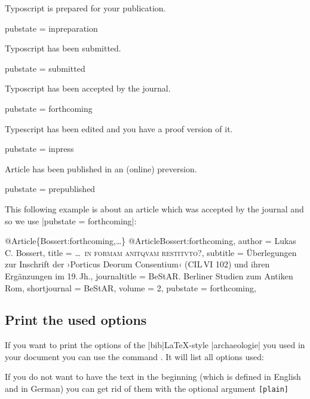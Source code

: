 \documentclass[a4paper,
10pt,
greek,
french,
spanish,
italian,
ngerman,
english
]{ltxdoc}
\begin{document}
Typoscript is prepared for your publication. 
\begin{code}
pubstate = {inpreparation}
\end{code}

Typoscript has been submitted.
\begin{code}
pubstate = {submitted}
\end{code}

Typoscript has been accepted by the journal.
\begin{code}
pubstate = {forthcoming}
\end{code}

Typescript has been edited and you have a proof version of it.
\begin{code}
pubstate = {inpress}
\end{code}

Article has been published in an (online) preversion.
\begin{code}
pubstate = {prepublished}
\end{code}


This following example is about an article which was accepted by the journal and so we use |pubstate = {forthcoming}|:
\begin{bibexample}[label=Bossert:forthcoming]{{@}Article\{Bossert:forthcoming,…\}}
@Article{Bossert:forthcoming,
  author       = {Lukas C. Bossert},
  title        = {\ldots\ \textsc{in formam anitqvam restitvto}?},
  subtitle     = {Überlegungen zur Inschrift der ›Porticus Deorum Consentium‹ (CIL\,VI 102) und ihren Ergänzungen im 19.{\,}Jh.},
  journaltitle = {BeStAR. Berliner Studien zum Antiken Rom},
  shortjournal = {BeStAR},
  volume       = {2},
  pubstate     = {forthcoming},
}
\end{bibexample}



\subsection{Print the used options}
If you want to print the options  of the |bib|\LaTeX -style |archaeologie| you used in your document you can use the command .
It will list all options used:
\begin{otherlanguage}{ngerman}
\begin{example}
\archaeologieoptions
\end{example}
\end{otherlanguage}
If you do not want to have the text in the beginning (which is defined in English and in German) you can get rid of them with the optional argument  \texttt{[plain]}
\begin{example}
\archaeologieoptions[plain]
\end{example}
\end{document}
